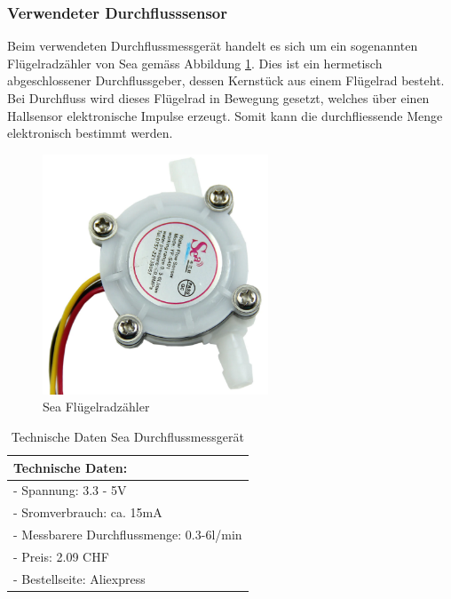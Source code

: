 \subsubsection{Verwendeter Durchflusssensor}\label{par:Verwendter_Durchflussssensor}

Beim verwendeten Durchflussmessgerät handelt es sich um ein sogenannten Flügelradzähler von Sea gemäss Abbildung \ref{fig:Flügelradzähler}. Dies ist ein hermetisch abgeschlossener Durchflussgeber, dessen Kernstück aus einem Flügelrad besteht. Bei Durchfluss wird dieses Flügelrad in Bewegung gesetzt, welches über einen Hallsensor elektronische Impulse erzeugt. Somit kann die durchfliessende Menge elektronisch bestimmt werden. \cite{five_+_tools_store_us_nodate}
 
\begin{figure}[h!]
	\centering
	\includegraphics[width=0.6\textwidth]{graphics/Fluegelradzaehler.png}
	\caption{Sea Flügelradzähler \cite{five_+_tools_store_us_nodate}}
	\label{fig:Flügelradzähler}
\end{figure}

\begin{table}[h!]
\centering
\begin{tabularx}{\textwidth/2}{|X|}
\hline
\textbf{Technische Daten:}\\
\hline
- Spannung: 3.3 - 5V\\

- Sromverbrauch: ca. 15mA\\

- Messbarere Durchflussmenge: 0.3-6l/min\\

- Preis: 2.09 CHF \\

- Bestellseite: Aliexpress\\

\hline
\end{tabularx}
\caption{Technische Daten Sea Durchflussmessgerät \cite{five_+_tools_store_us_nodate}}
\end{table}

